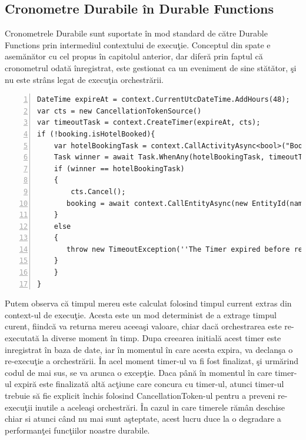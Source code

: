 \subsection{Cronometre Durabile în Durable Functions}
\quad Cronometrele Durabile sunt suportate în mod standard de către Durable Functions prin intermediul contextului de execuţie. Conceptul din spate e asemănător cu cel propus în capitolul anterior, dar diferă prin faptul că cronometrul odată înregistrat, este gestionat ca un eveniment de sine stătător, şi nu este strâns legat de execuţia orchestrării. 
\begin{lstlisting}[numbers=left]
DateTime expireAt = context.CurrentUtcDateTime.AddHours(48);
var cts = new CancellationTokenSource()
var timeoutTask = context.CreateTimer(expireAt, cts);
if (!booking.isHotelBooked){
	var hotelBookingTask = context.CallActivityAsync<bool>("BookFlight", null);
	Task winner = await Task.WhenAny(hotelBookingTask, timeoutTask);
    if (winner == hotelBookingTask)
    {
    	cts.Cancel();
       booking = await context.CallEntityAsync(new EntityId(nameof(Booking), entityGuid),"UpdateFlight", isFlightBooked);
    }
    else
    {
       throw new TimeoutException(''The Timer expired before receiving a response from the hotel activity'');
    }
	}	
}
\end{lstlisting}
\par Putem observa că timpul mereu este calculat folosind timpul current extras din context-ul de execuţie. Acesta este un mod determinist de a extrage timpul curent, fiindcă va returna mereu aceeaşi valoare, chiar dacă orchestrarea este re-executată la diverse moment în timp. Dupa creearea initială acest timer este inregistrat în baza de date, iar în momentul în care acesta expira, va declanşa o re-execuţie a orchestrării. În acel moment timer-ul va fi fost finalizat, şi urmărind codul de mai sus, se va arunca o excepţie. Daca până în momentul în care timer-ul expiră este finalizată altă acţiune care concura cu timer-ul, atunci timer-ul trebuie să fie explicit închis folosind CancellationToken-ul pentru a preveni re-execuţii inutile a aceleaşi orchestrări. În cazul in care timerele rămân deschise chiar si atunci când nu mai sunt aşteptate, acest lucru duce la o degradare a performanţei funcţiilor noastre durabile. 
